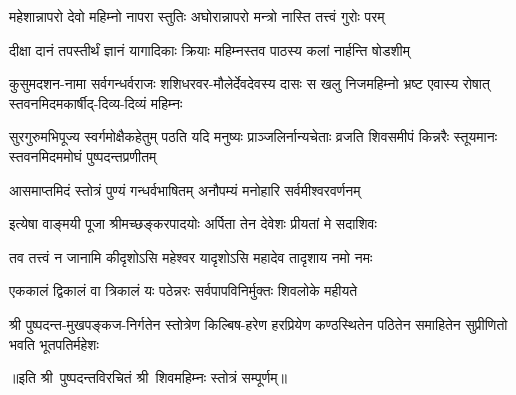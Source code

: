 \twolineshloka
{महेशान्नापरो देवो महिम्नो नापरा स्तुतिः}
{अघोरान्नापरो मन्त्रो नास्ति तत्त्वं गुरोः परम्}%

\twolineshloka
{दीक्षा दानं तपस्तीर्थं ज्ञानं यागादिकाः क्रियाः}
{महिम्नस्तव पाठस्य कलां नार्हन्ति षोडशीम्}%

\fourlineindentedshloka
{कुसुमदशन-नामा सर्वगन्धर्वराजः}
{शशिधरवर-मौलेर्देवदेवस्य दासः}
{स खलु निजमहिम्नो भ्रष्ट एवास्य रोषात्}
{स्तवनमिदमकार्षीद्-दिव्य-दिव्यं महिम्नः}%

\fourlineindentedshloka
{सुरगुरुमभिपूज्य स्वर्गमोक्षैकहेतुम्}
{पठति यदि मनुष्यः प्राञ्जलिर्नान्यचेताः}
{व्रजति शिवसमीपं किन्नरैः स्तूयमानः}
{स्तवनमिदममोघं पुष्पदन्तप्रणीतम्}%

\twolineshloka
{आसमाप्तमिदं स्तोत्रं पुण्यं गन्धर्वभाषितम्}
{अनौपम्यं मनोहारि सर्वमीश्वरवर्णनम्}%

\twolineshloka
{इत्येषा वाङ्मयी पूजा श्रीमच्छङ्करपादयोः}
{अर्पिता तेन देवेशः प्रीयतां मे सदाशिवः}%

\twolineshloka
{तव तत्त्वं न जानामि कीदृशोऽसि महेश्वर}
{यादृशोऽसि महादेव तादृशाय नमो नमः}%

\twolineshloka
{एककालं द्विकालं वा त्रिकालं यः पठेन्नरः}
{सर्वपापविनिर्मुक्तः शिवलोके महीयते}%

\fourlineindentedshloka
{श्री पुष्पदन्त-मुखपङ्कज-निर्गतेन}
{स्तोत्रेण किल्बिष-हरेण हरप्रियेण}
{कण्ठस्थितेन पठितेन समाहितेन}
{सुप्रीणितो भवति भूतपतिर्महेशः}%

॥इति श्री~पुष्पदन्तविरचितं श्री~शिवमहिम्नः स्तोत्रं सम्पूर्णम्॥